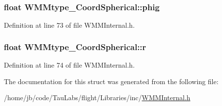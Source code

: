 \hypertarget{struct_w_m_mtype___coord_spherical_a94d857d131a4281543b46b4f3dc2a28e}{
\subsubsection[{phig}]{\setlength{\rightskip}{0pt plus 5cm}float {\bf \-W\-M\-Mtype\-\_\-\-Coord\-Spherical\-::phig}}}\label{struct_w_m_mtype___coord_spherical_a94d857d131a4281543b46b4f3dc2a28e}


\-Definition at line 73 of file \-W\-M\-M\-Internal.\-h.

\hypertarget{struct_w_m_mtype___coord_spherical_ad7a66b81a59d40782c0618c94256073f}{
\subsubsection[{r}]{\setlength{\rightskip}{0pt plus 5cm}float {\bf \-W\-M\-Mtype\-\_\-\-Coord\-Spherical\-::r}}}\label{struct_w_m_mtype___coord_spherical_ad7a66b81a59d40782c0618c94256073f}


\-Definition at line 74 of file \-W\-M\-M\-Internal.\-h.



\-The documentation for this struct was generated from the following file\-:\begin{DoxyCompactItemize}
\item 
/home/jb/code/\-Tau\-Labs/flight/\-Libraries/inc/\hyperlink{_w_m_m_internal_8h}{\-W\-M\-M\-Internal.\-h}\end{DoxyCompactItemize}

